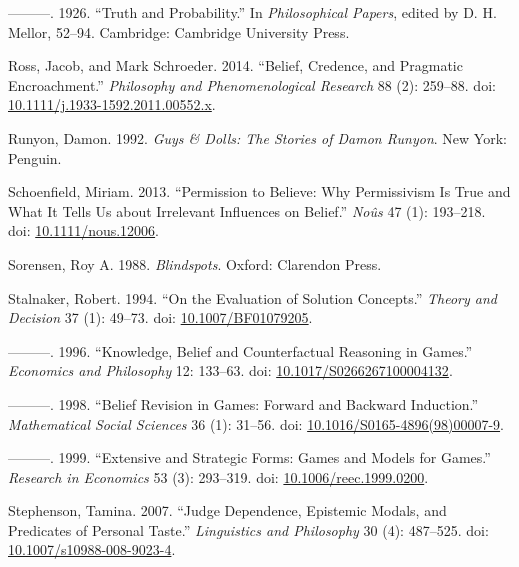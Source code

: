\documentclass[
  11pt,
  letterpaper,
  DIV=11,
  numbers=noendperiod,
  twoside]{scrartcl}
\newlength{\cslhangindent}
\newenvironment{CSLReferences}[2] %
 {\begin{list}{}{%
  \setlength{\itemindent}{0pt}
  \setlength{\leftmargin}{0pt}
  \setlength{\parsep}{0pt}
  \ifodd #1
   \setlength{\leftmargin}{\cslhangindent}
   \setlength{\itemindent}{-1\cslhangindent}
  \fi
  \setlength{\itemsep}{#2\baselineskip}}}
 {\end{list}}
\begin{document}
\begin{CSLReferences}{1}{0}
---------. 1926. {``Truth and Probability.''} In \emph{Philosophical
Papers}, edited by D. H. Mellor, 52--94. Cambridge: Cambridge University
Press.

Ross, Jacob, and Mark Schroeder. 2014. {``Belief, Credence, and
Pragmatic Encroachment.''} \emph{Philosophy and Phenomenological
Research} 88 (2): 259--88. doi:
\href{https://doi.org/10.1111/j.1933-1592.2011.00552.x}{10.1111/j.1933-1592.2011.00552.x}.

Runyon, Damon. 1992. \emph{Guys \& Dolls: The Stories of {D}amon
{R}unyon}. New York: Penguin.

Schoenfield, Miriam. 2013. {``Permission to Believe: Why Permissivism Is
True and What It Tells Us about Irrelevant Influences on Belief.''}
\emph{No{û}s} 47 (1): 193--218. doi:
\href{https://doi.org/10.1111/nous.12006}{10.1111/nous.12006}.

Sorensen, Roy A. 1988. \emph{Blindspots}. Oxford: Clarendon Press.

Stalnaker, Robert. 1994. {``On the Evaluation of Solution Concepts.''}
\emph{Theory and Decision} 37 (1): 49--73. doi:
\href{https://doi.org/10.1007/BF01079205}{10.1007/BF01079205}.

---------. 1996. {``Knowledge, Belief and Counterfactual Reasoning in
Games.''} \emph{Economics and Philosophy} 12: 133--63. doi:
\href{https://doi.org/10.1017/S0266267100004132}{10.1017/S0266267100004132}.

---------. 1998. {``Belief Revision in Games: Forward and Backward
Induction.''} \emph{Mathematical Social Sciences} 36 (1): 31--56. doi:
\href{https://doi.org/10.1016/S0165-4896(98)00007-9}{10.1016/S0165-4896(98)00007-9}.

---------. 1999. {``Extensive and Strategic Forms: Games and Models for
Games.''} \emph{Research in Economics} 53 (3): 293--319. doi:
\href{https://doi.org/10.1006/reec.1999.0200}{10.1006/reec.1999.0200}.

Stephenson, Tamina. 2007. {``Judge Dependence, Epistemic Modals, and
Predicates of Personal Taste.''} \emph{Linguistics and Philosophy} 30
(4): 487--525. doi:
\href{https://doi.org/10.1007/s10988-008-9023-4}{10.1007/s10988-008-9023-4}.


\end{CSLReferences}
\end{document}
